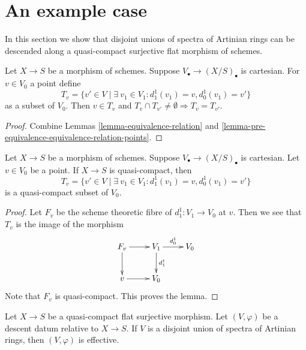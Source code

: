 \section{An example case}
\label{section-example}

\noindent
In this section we show that disjoint unions of spectra
of Artinian rings can be descended along a quasi-compact
surjective flat morphism of schemes.

\begin{lemma}
\label{lemma-equivalence-classes-points}
Let $X \to S$ be a morphism of schemes.
Suppose $V_\bullet \to (X/S)_\bullet$ is cartesian.
For $v \in V_0$ a point define
$$
T_v = \{v' \in V \mid \exists\ v_1 \in V_1:
d^1_1(v_1) = v, d^1_0(v_1) = v'\}
$$
as a subset of $V_0$. Then $v \in T_v$ and
$T_v \cap T_{v'} \not = \emptyset \Rightarrow T_v = T_{v'}$.
\end{lemma}

\begin{proof}
Combine Lemmas \ref{lemma-equivalence-relation} and
\ref{lemma-pre-equivalence-equivalence-relation-points}.
\end{proof}

\begin{lemma}
\label{lemma-quasi-compact}
Let $X \to S$ be a morphism of schemes.
Suppose $V_\bullet \to (X/S)_\bullet$ is cartesian.
Let $v \in V_0$ be a point. If $X \to S$ is quasi-compact, then
$$
T_v = \{v' \in V \mid \exists\ v_1 \in V_1:
d^1_1(v_1) = v, d^1_0(v_1) = v'\}
$$
is a quasi-compact subset of $V_0$.
\end{lemma}

\begin{proof}
Let $F_v$ be the scheme theoretic fibre of $d^1_1 : V_1 \to V_0$
at $v$. Then we see that $T_v$ is the image of the morphism
$$
\xymatrix{
F_v \ar[r] \ar[d] &
V_1 \ar[r]^{d^1_0} \ar[d]^{d^1_1} &
V_0 \\
v \ar[r] &
V_0 &
}
$$
Note that $F_v$ is quasi-compact. This proves the lemma.
\end{proof}

\begin{lemma}
\label{lemma-descent-disjoint-union-Artinian-along-fields}
Let $X \to S$ be a quasi-compact flat surjective morphism.
Let $(V, \varphi)$ be a descent datum relative
to $X \to S$. If $V$ is a disjoint union of
spectra of Artinian rings, then $(V, \varphi)$
is effective.
\end{lemma}

